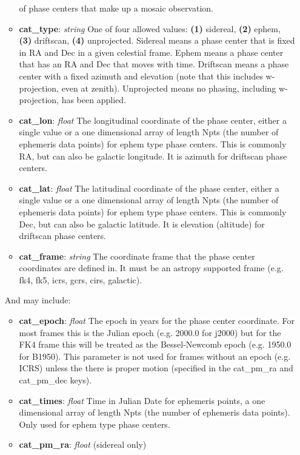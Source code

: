 \documentclass[11pt, oneside]{article}
\begin{document}
\begin{itemize}
\begin{itemize}
	  of phase centers that make up a mosaic observation.
	\item \textbf{cat\_type}: \textit{string} One of four allowed values:
	  \textbf{(1)} sidereal, \textbf{(2)} ephem, \textbf{(3)} driftscan,
	  \textbf{(4)} unprojected.
  	  Sidereal means a phase center that is fixed in RA and Dec in a given
	  celestial frame.
	  Ephem means a phase center that has an RA and Dec that
	  moves with time.
	  Driftscan means a phase center with a fixed azimuth and
	  elevation (note that this includes w-projection, even at zenith).
	  Unprojected means no phasing, including w-projection, has been applied.
  	\item \textbf{cat\_lon}: \textit{float}
	  The longitudinal coordinate of the phase center, either a single value or a
	  one dimensional array of length Npts (the number of ephemeris data points)
	  for ephem type phase centers.
	  This is commonly RA, but can also be galactic longitude. It is azimuth for
	  driftscan phase centers.
  	\item \textbf{cat\_lat}: \textit{float}
	  The latitudinal coordinate of the phase center, either a single value or a
	  one dimensional array of length Npts (the number of ephemeris data points)
	  for ephem type phase centers.
	  This is commonly Dec, but can also be galactic latitude. It is elevation (altitude)
	  for driftscan phase centers.
	\item \textbf{cat\_frame}: \textit{string} The coordinate frame that the
	  phase center coordinates are defined in. It must be an astropy
	  supported frame (e.g. fk4, fk5, icrs, gcrs, cirs, galactic).
	\end{itemize}
And may include:
	\begin{itemize}
	\item \textbf{cat\_epoch}: \textit{float} The epoch in years for the phase
	  center coordinate. For most frames this is the Julian epoch
	  (e.g. 2000.0 for j2000) but for the FK4 frame this will be treated as the
	  Bessel-Newcomb epoch (e.g. 1950.0 for B1950). This parameter is
	  not used for frames without an epoch (e.g. ICRS) unless the there
	  is proper motion (specified in the cat\_pm\_ra and cat\_pm\_dec keys).
	\item \textbf{cat\_times}: \textit{float}
	  Time in Julian Date for ephemeris points, a one dimensional array of
	  length Npts (the number of ephemeris data points).
	  Only used for ephem type phase centers.
	\item \textbf{cat\_pm\_ra}: \textit{float} (sidereal only)

\end{itemize}
\end{itemize}
\end{document}

